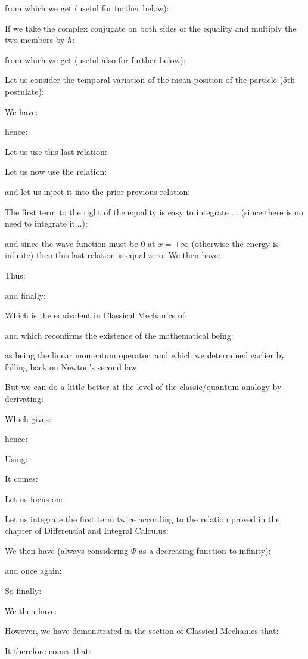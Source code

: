 	from which we get (useful for further below):
	
	If we take the complex conjugate on both sides of the equality and multiply the two members by $\hbar$:
	
	from which we get (useful also for further below):
	
	Let us consider the temporal variation of the mean position of the particle (5th postulate):
	
	We have:
	
	hence:
	
	Let us use this last relation:
	
	Let us now use the relation:
	
	and let us inject it into the prior-previous relation:
	
	The first term to the right of the equality is easy to integrate ... (since there is no need to integrate it...):
	
	and since the wave function must be $0$ at $x=\pm \infty$  (otherwise the energy is infinite) then this last relation is equal zero. We then have:
	
	Thus:
	
	and finally:
	
	Which is the equivalent in Classical Mechanics of:
	
	and which reconfirms the existence of the mathematical being:
	
	as being the linear momentum operator, and which we determined earlier by falling back on Newton's second law.

	But we can do a little better at the level of the classic/quantum analogy by derivating:
	
	Which gives:
	
	hence:
	
	Using:
	
	It comes:
	
	Let us focus on:
	
	Let us integrate the first term twice according to the relation proved in the chapter of Differential and Integral Calculus:
	
	We then have (always considering $\Psi$ as a decreasing function to infinity):
	
	and once again:
	
	So finally:
	
	We then have:
	
	However, we have demonstrated in the section of Classical Mechanics that:
	
	It therefore comes that:
	
